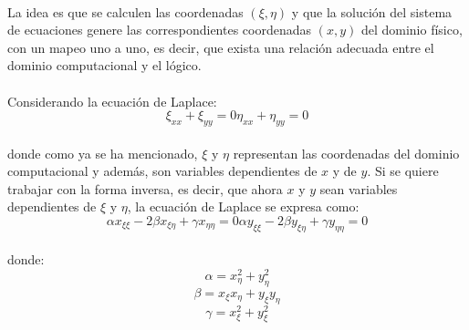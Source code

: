 \documentclass[letterpaper, openright, 12pt]{book}
\begin{document}
    \paragraph*{}
        La idea es que se calculen las coordenadas $(\xi, \eta)$ y que la
        solución del sistema de ecuaciones genere las correspondientes
        coordenadas $(x, y)$ del dominio físico, con un mapeo uno a uno, es
        decir, que exista una relación adecuada entre el dominio computacional y
        el lógico.

    \paragraph*{}
        Considerando la ecuación de Laplace:
        \begin{subequations}
            \begin{equation}
                \xi_{xx} + \xi_{yy} = 0
            \end{equation}
            \begin{equation}
                \eta_{xx} + \eta_{yy} = 0
            \end{equation}
            \label{ec-laplace}
        \end{subequations}\\
        donde como ya se ha mencionado, $\xi$ y $\eta$ representan las
        coordenadas del dominio computacional y además, son variables
        dependientes de $x$ y de $y$. Si se quiere trabajar con la forma
        inversa, es decir, que ahora $x$ y $y$ sean variables dependientes de
        $\xi$ y $\eta$, la ecuación  de Laplace se expresa como:
        \begin{subequations}
            \begin{equation}
                \alpha x_{\xi \xi} - 2\beta x_{\xi \eta} + \gamma x_{\eta \eta} = 0
            \end{equation}
            \begin{equation}
                \alpha y_{\xi \xi} - 2\beta y_{\xi \eta} + \gamma y_{\eta \eta} = 0
            \end{equation}
            \label{ec-laplace-invertida}
        \end{subequations}\\

        donde:
        \begin{equation*}
            \alpha = x_{\eta} ^ 2 + y_{\eta}^2
        \end{equation*}
        \begin{equation*}
            \beta = x_{\xi} x_{\eta} + y_{\xi} y_{\eta}
        \end{equation*}
        \begin{equation*}
            \gamma = x_{\xi} ^ 2 + y_{\xi} ^ 2
        \end{equation*}
\end{document}
